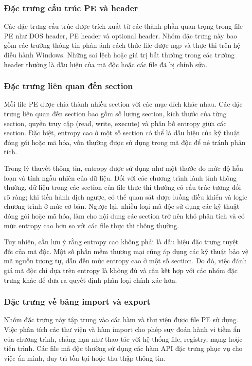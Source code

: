 \subsubsection{Đặc trưng cấu trúc PE và header}

Các đặc trưng cấu trúc được trích xuất từ các thành phần quan trọng
trong file PE như DOS header, PE header và optional header. Nhóm đặc
trưng này bao gồm các trường thông tin phản ánh cách thức file được
nạp và thực thi trên hệ điều hành Windows. Những sai lệch hoặc giá
trị bất thường trong các trường header thường là dấu hiệu của mã độc
hoặc các file đã bị chỉnh sửa.

\subsubsection{Đặc trưng liên quan đến section}

Mỗi file PE được chia thành nhiều section với các mục đích khác nhau.
Các đặc trưng liên quan đến section bao gồm số lượng section, kích
thước của từng section, quyền truy cập (read, write, execute) và phân
bố entropy giữa các section. Đặc biệt, entropy cao ở một số section
có thể là dấu hiệu của kỹ thuật đóng gói hoặc mã hóa, vốn thường
được sử dụng trong mã độc để né tránh phân tích.

Trong lý thuyết thông tin, entropy được sử dụng như một thước đo mức
độ hỗn loạn và tính ngẫu nhiên của dữ liệu. Đối với các chương trình
lành tính thông thường, dữ liệu trong các section của file thực thi
thường có cấu trúc tương đối rõ ràng; khi tiến hành dịch ngược, có
thể quan sát được luồng điều khiển và logic chương trình ở mức cơ bản.
Ngược lại, nhiều loại mã độc sử dụng các kỹ thuật đóng gói hoặc mã
hóa, làm cho nội dung các section trở nên khó phân tích và có mức
entropy cao hơn so với các file thực thi thông thường.

Tuy nhiên, cần lưu ý rằng entropy cao không phải là dấu hiệu đặc
trưng tuyệt đối của mã độc. Một số phần mềm thương mại cũng áp dụng
các kỹ thuật bảo vệ mã nguồn tương tự, dẫn đến mức entropy cao ở một
số section. Do đó, việc đánh giá mã độc chỉ dựa trên entropy là không
đủ và cần kết hợp với các nhóm đặc trưng khác để đưa ra quyết định
phân loại chính xác hơn.

\subsubsection{Đặc trưng về bảng import và export}

Nhóm đặc trưng này tập trung vào các hàm và thư viện được file PE sử
dụng. Việc phân tích các thư viện và hàm import cho phép suy đoán hành
vi tiềm ẩn của chương trình, chẳng hạn như thao tác với hệ thống file,
registry, mạng hoặc tiến trình. Các file mã độc thường sử dụng các hàm
API đặc trưng phục vụ cho việc ẩn mình, duy trì tồn tại hoặc thu thập
thông tin.

